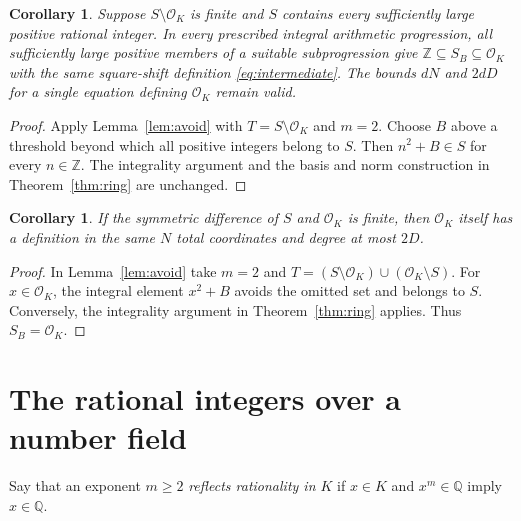 \documentclass[11pt,a4paper]{article}
\newtheorem{corollary}[theorem]{Corollary}
\newcommand{\Q}{\mathbb Q}\newcommand{\Z}{\mathbb Z}
\newcommand{\OK}{\mathcal O_K}
\begin{document}
\begin{corollary}\label{cor:positive-integrality}
Suppose $S\setminus\OK$ is finite and $S$ contains every
sufficiently large positive rational integer. In every prescribed
integral arithmetic progression, all sufficiently large positive
members of a suitable subprogression give
$\Z\subseteq S_B\subseteq\OK$ with the same square-shift
definition \eqref{eq:intermediate}. The bounds $dN$ and $2dD$
for a single equation defining $\OK$ remain valid.
\end{corollary}
\begin{proof}
Apply Lemma~\ref{lem:avoid} with $T=S\setminus\OK$ and $m=2$.
Choose $B$ above a threshold beyond which all positive integers
belong to $S$. Then $n^2+B\in S$ for every $n\in\Z$.
The integrality argument and the basis and norm construction in
Theorem~\ref{thm:ring} are unchanged.
\end{proof}

\begin{corollary}\label{cor:almost-ring}
If the symmetric difference of $S$ and $\OK$ is finite, then
$\OK$ itself has a definition in the same $N$ total coordinates
and degree at most $2D$.
\end{corollary}
\begin{proof}
In Lemma~\ref{lem:avoid} take $m=2$ and
$T=(S\setminus\OK)\cup(\OK\setminus S)$. For $x\in\OK$,
the integral element $x^2+B$ avoids the omitted set and belongs to
$S$. Conversely, the integrality argument in
Theorem~\ref{thm:ring} applies. Thus $S_B=\OK$.
\end{proof}

\section{The rational integers over a number field}
Say that an exponent $m\ge2$ \emph{reflects rationality in $K$}
if $x\in K$ and $x^m\in\Q$ imply $x\in\Q$.
\end{document}
